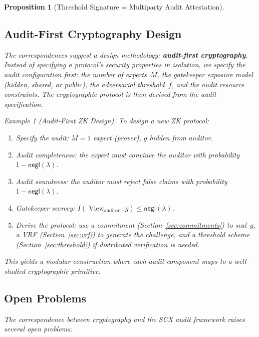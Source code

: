 \documentclass[12pt,a4paper]{article}
\newtheorem{proposition}[theorem]{Proposition}
\theoremstyle{remark}
\newtheorem{example}[theorem]{Example}
\newcommand{\SCX}{\textsf{SCX}}
\newcommand{\negl}{\textsf{negl}}
\DeclareMathOperator{\View}{View}
\begin{document}
\begin{proposition}[Threshold Signature = Multiparty Audit Attestation]
\subsection{Audit-First Cryptography Design}

The correspondences suggest a design methodology: \textbf{audit-first cryptography}. Instead of specifying a protocol's security properties in isolation, we specify the audit configuration first: the number of experts~$M$, the gatekeeper exposure model (hidden, shared, or public), the adversarial threshold~$f$, and the audit resource constraints. The cryptographic protocol is then derived from the audit specification.

\begin{example}[Audit-First ZK Design]
\label{ex:audit_zk_design}
To design a new ZK protocol:
\begin{enumerate}[leftmargin=*, label=(\arabic*)]
  \item Specify the audit: $M = 1$ expert (prover), $g$ hidden from auditor.
  \item Audit completeness: the expert must convince the auditor with probability $1 - \negl(\lambda)$.
  \item Audit soundness: the auditor must reject false claims with probability $1 - \negl(\lambda)$.
  \item Gatekeeper secrecy: $I(\View_{\text{auditor}}; g) \leq \negl(\lambda)$.
  \item Derive the protocol: use a commitment (Section~\ref{sec:commitments}) to seal~$g$, a VRF (Section~\ref{sec:vrf}) to generate the challenge, and a threshold scheme (Section~\ref{sec:threshold}) if distributed verification is needed.
\end{enumerate}
This yields a modular construction where each audit component maps to a well-studied cryptographic primitive.
\end{example}

\subsection{Open Problems}

The correspondence between cryptography and the \SCX{} audit framework raises several open problems:


\end{proposition}
\end{document}
